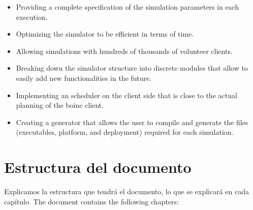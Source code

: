 \begin{itemize}

\item Providing a complete specification of the simulation parameters in each execution.

\item Optimizing the simulator to be efficient in terms of time.

\item Allowing simulations with hundreds of thousands of volunteer clients.

\item Breaking down the simulator structure into discrete modules that allow to easily add new functionalities in the future.

\item Implementing an scheduler on the client side that is close to the actual planning of the \gls{boinc} client.

\item Creating a generator that allows the user to compile and generate the files (executables, platform, and deployment) required for each simulation.

\end{itemize}

\section{Estructura del documento}
\label{sec:document_structure}

Explicamos la estructura que tendrá el documento, lo que se explicará en cada capítulo.
The document contains the following chapters:

